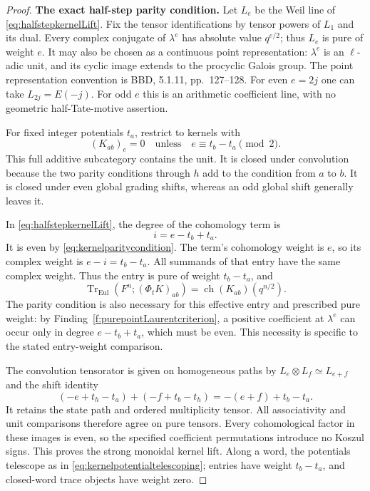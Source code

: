 \documentclass[11pt,a4paper]{article}
\theoremstyle{named}\newtheorem{finding}{Finding}[section]
\theoremstyle{definition}\newtheorem{definition}[finding]{Definition}
\theoremstyle{remark}\newtheorem{remark}[finding]{Remark}
\begin{document}
\begin{proof}
\par\smallskip\noindent\textbf{The exact half-step parity condition.}\quad
Let \(L_e\) be the Weil line of
\eqref{eq:halfstepkernelLift}. Fix the tensor
identifications by tensor powers of \(L_1\) and its dual.
Every complex conjugate of \(\lambda^e\) has absolute
value \(q^{e/2}\); thus \(L_e\) is pure of weight \(e\).
It may also be chosen as a continuous point representation:
\(\lambda^e\) is an \(\ell\)-adic unit, and its cyclic
image extends to the procyclic Galois group. The point
representation convention is BBD, 5.1.11, pp.~127--128.
For even \(e=2j\) one can take \(L_{2j}=E(-j)\).
For odd \(e\) this is an arithmetic coefficient line,
with no geometric half-Tate-motive assertion.

For fixed integer potentials \(t_a\), restrict to kernels
with
\begin{equation}\label{eq:kernelparitycondition}
       (K_{ab})_e=0
       \quad\text{unless}\quad
       e\equiv t_b-t_a\pmod2.
\end{equation}
This full additive subcategory contains the unit.
It is closed under convolution because the two parity
conditions through \(h\) add to the condition from \(a\)
to \(b\). It is closed under even global grading shifts,
whereas an odd global shift generally leaves it.

In \eqref{eq:halfstepkernelLift}, the degree of the
cohomology term is
\[
                   i=e-t_b+t_a.
\]
It is even by \eqref{eq:kernelparitycondition}.
The term's cohomology weight is \(e\), so its complex
weight is \(e-i=t_b-t_a\). All summands of that entry have
the same complex weight. Thus the entry is pure of
weight \(t_b-t_a\), and
\begin{equation}\label{eq:halfstepkernelTrace}
 \operatorname{Tr}_{\mathrm{Eul}}
   (F^n;(\Phi_tK)_{ab})
     =\operatorname{ch}(K_{ab})(q^{n/2}).
\end{equation}
The parity condition is also necessary for this effective
entry and prescribed pure weight: by
Finding~\ref{f:purepointLaurentcriterion}, a positive
coefficient at \(\lambda^e\) can occur only in degree
\(e-t_b+t_a\), which must be even. This necessity is
specific to the stated entry-weight comparison.

The convolution tensorator is given on homogeneous paths
by \(L_e\otimes L_f\simeq L_{e+f}\) and the shift identity
\begin{equation}\label{eq:kernelpotentialtelescoping}
 (-e+t_h-t_a)+(-f+t_b-t_h)
       =-(e+f)+t_b-t_a.
\end{equation}
It retains the state path and ordered multiplicity tensor.
All associativity and unit comparisons therefore agree
on pure tensors. Every cohomological factor in these
images is even, so the specified coefficient permutations
introduce no Koszul signs. This proves the strong
monoidal kernel lift.
Along a word, the potentials telescope as in
\eqref{eq:kernelpotentialtelescoping}; entries have weight
\(t_b-t_a\), and closed-word trace objects have weight zero.


\end{proof}
\end{document}
